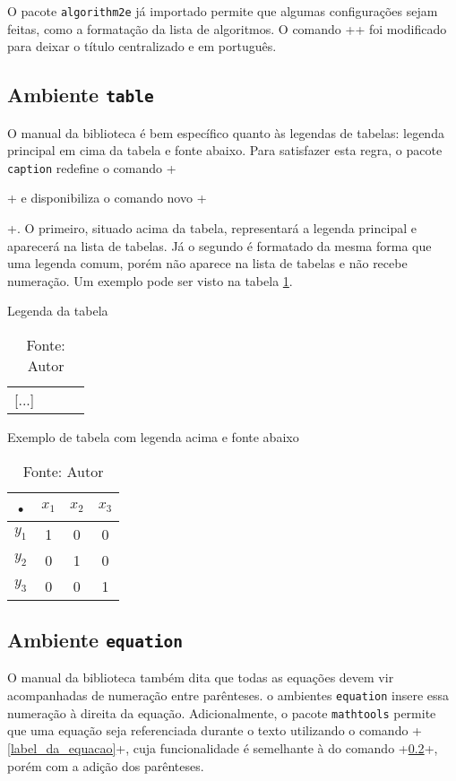 \documentclass{fei}
\begin{document}
    O pacote \texttt{algorithm2e} já importado permite que algumas configurações sejam feitas, como a formatação da lista de algoritmos. O comando \latexinline+\listofalgorithms+ foi modificado para deixar o título centralizado e em português.
    
    \subsection{Ambiente \texttt{table}}

	O manual da biblioteca é bem específico quanto às legendas de tabelas: legenda principal em cima da tabela e fonte abaixo. Para satisfazer esta regra, o pacote \texttt{caption} redefine o comando \latexinline+\caption{}+ e disponibiliza o comando novo \latexinline+\caption*{}+. O primeiro, situado acima da tabela, representará a legenda principal e aparecerá na lista de tabelas. Já o segundo é formatado da mesma forma que uma legenda comum, porém não aparece na lista de tabelas e não recebe numeração. Um exemplo pode ser visto na tabela \ref{tbl:exemplo}.

\begin{latexcode}
\begin{table}[ht!]
	\caption{Legenda da tabela}
	\begin{tabular}{|c|c|c|c|}
		[...]
	\end{tabular}
	\caption*{Fonte: Autor}
\end{table}
\end{latexcode}

\begin{table}[ht!]
    \caption{Exemplo de tabela com legenda acima e fonte abaixo} \label{tbl:exemplo}
    \centering
    \begin{tabular}{|c|c|c|c|}
    \hline 
    • & \(x_1\) & \(x_2\) & \(x_3\) \\ 
    \hline 
    \(y_1\) & 1 & 0 & 0 \\ 
    \hline 
    \(y_2\) & 0 & 1 & 0 \\ 
    \hline 
    \(y_3\) & 0 & 0 & 1 \\ 
    \hline 
    \end{tabular}
    \caption*{Fonte: Autor}
\end{table}

	\subsection{Ambiente \texttt{equation}}
	
	O manual da biblioteca também dita que todas as equações devem vir acompanhadas de numeração entre parênteses. o ambientes \texttt{equation} insere essa numeração à direita da equação. Adicionalmente, o pacote \texttt{mathtools} permite que uma equação seja referenciada durante o texto utilizando o comando \latexinline+\eqref{label_da_equacao}+, cuja funcionalidade é semelhante à do comando \latexinline+\ref{}+, porém com a adição dos parênteses.
	
\end{document}
